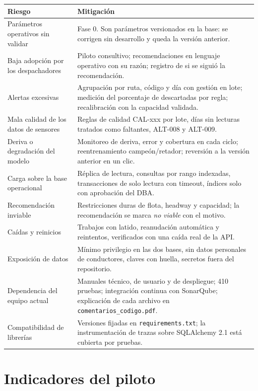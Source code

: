 \documentclass[11pt,a4paper]{article}
\newcommand{\cod}[1]{\texttt{\small #1}}
\begin{document}
\begin{longtable}{@{}p{}p{}@{}}
\toprule
\textbf{Riesgo} & \textbf{Mitigación} \\
\midrule
\endhead
Parámetros operativos sin validar & Fase 0. Son parámetros versionados en la base: se corrigen sin desarrollo y queda la versión anterior. \\
Baja adopción por los despachadores & Piloto consultivo; recomendaciones en lenguaje operativo con su razón; registro de si se siguió la recomendación. \\
Alertas excesivas & Agrupación por ruta, código y día con gestión en lote; medición del porcentaje de descartadas por regla; recalibración con la capacidad validada. \\
Mala calidad de los datos de sensores & Reglas de calidad CAL-xxx por lote, días sin lecturas tratados como faltantes, ALT-008 y ALT-009. \\
Deriva o degradación del modelo & Monitoreo de deriva, error y cobertura en cada ciclo; reentrenamiento campeón/retador; reversión a la versión anterior en un clic. \\
Carga sobre la base operacional & Réplica de lectura, consultas por rango indexadas, transacciones de solo lectura con timeout, índices solo con aprobación del DBA. \\
Recomendación inviable & Restricciones duras de flota, headway y capacidad; la recomendación se marca \emph{no viable} con el motivo. \\
Caídas y reinicios & Trabajos con latido, reanudación automática y reintentos, verificados con una caída real de la API. \\
Exposición de datos & Mínimo privilegio en las dos bases, sin datos personales de conductores, claves con huella, secretos fuera del repositorio. \\
Dependencia del equipo actual & Manuales técnico, de usuario y de despliegue; 410 pruebas; integración continua con SonarQube; explicación de cada archivo en \cod{comentarios\_codigo.pdf}. \\
Compatibilidad de librerías & Versiones fijadas en \cod{requirements.txt}; la instrumentación de trazas sobre SQLAlchemy 2.1 está cubierta por pruebas. \\
\bottomrule
\end{longtable}

\section{Indicadores del piloto}\label{sec:indicadores}
\end{document}

